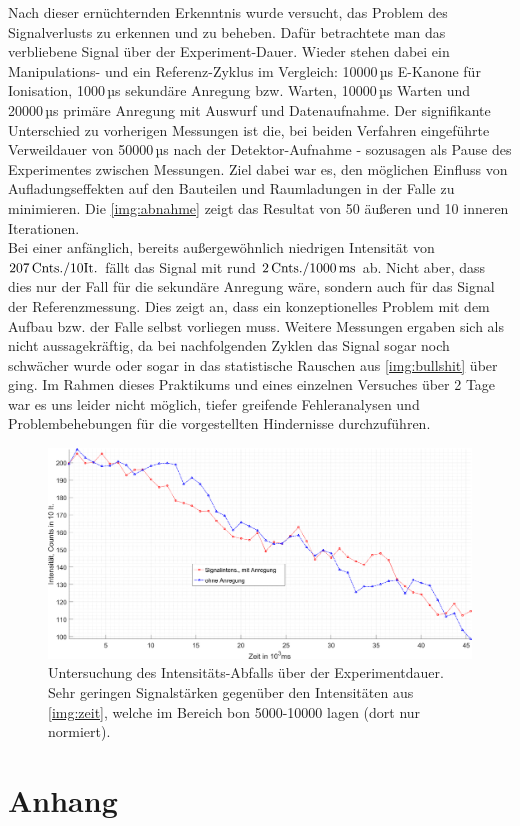 \documentclass[numbers=noenddot,a4paper,notitlepage,twoside,BCOR15mm]{scrartcl}
\begin{document}
			Nach dieser ernüchternden Erkenntnis wurde versucht, das Problem des Signalverlusts zu erkennen und zu beheben. Dafür betrachtete man das verbliebene Signal über der Experiment-Dauer. Wieder stehen dabei ein Manipulations- und ein Referenz-Zyklus im Vergleich: 10000\,µs E-Kanone für Ionisation, 1000\,µs sekundäre Anregung bzw. Warten, 10000\,µs Warten und 20000\,µs primäre Anregung mit Auswurf und Datenaufnahme. Der signifikante Unterschied zu vorherigen Messungen ist die, bei beiden Verfahren eingeführte Verweildauer von 50000\,µs nach der Detektor-Aufnahme - sozusagen als Pause des Experimentes zwischen Messungen. Ziel dabei war es, den möglichen Einfluss von Aufladungseffekten auf den Bauteilen und Raumladungen in der Falle zu minimieren. Die \autoref{img:abnahme} zeigt das Resultat von 50 äußeren und 10 inneren Iterationen.\\
			Bei einer anfänglich, bereits außergewöhnlich niedrigen Intensität von $\unit[207]{Cnts./10 It.}$ fällt das Signal mit rund $\unit[2]{Cnts./1000\,ms}$ ab. Nicht aber, dass dies nur der Fall für die sekundäre Anregung wäre, sondern auch für das Signal der Referenzmessung. Dies zeigt an, dass ein konzeptionelles Problem mit dem Aufbau bzw. der Falle selbst vorliegen muss. Weitere Messungen ergaben sich als nicht aussagekräftig, da bei nachfolgenden Zyklen das Signal sogar noch schwächer wurde oder sogar in das statistische Rauschen aus \autoref{img:bullshit} über ging. Im Rahmen dieses Praktikums und eines einzelnen Versuches über 2 Tage war es uns leider nicht möglich, tiefer greifende Fehleranalysen und Problembehebungen für die vorgestellten Hindernisse durchzuführen.

				\begin{figure}
					\includegraphics[width=\textwidth]{signal_abfall.png}
					\caption{Untersuchung des Intensitäts-Abfalls über der Experimentdauer. Sehr geringen Signalstärken gegenüber den Intensitäten aus \autoref{img:zeit}, welche im Bereich bon 5000-10000 lagen (dort nur normiert).}\label{img:abnahme}
				\end{figure}

	\clearpage
	\section{Anhang}

		
		
\end{document}

